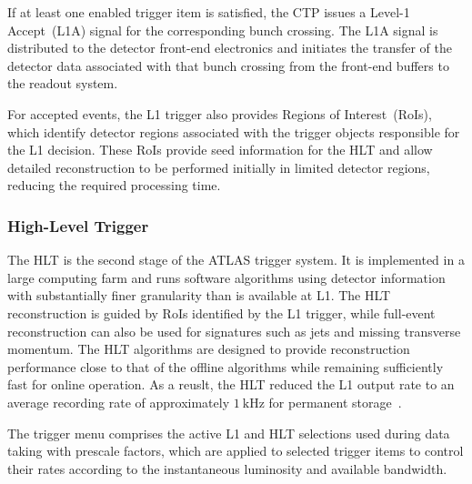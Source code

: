 If at least one enabled trigger item is satisfied, the CTP issues a Level-1 Accept~(L1A) signal for the corresponding bunch crossing.
The L1A signal is distributed to the detector front-end electronics and initiates the transfer of the detector data associated with that bunch crossing from the front-end buffers to the readout system.

For accepted events, the L1 trigger also provides Regions of Interest~(RoIs), which identify detector regions associated with the trigger objects responsible for the L1 decision.
These RoIs provide seed information for the HLT and allow detailed reconstruction to be performed initially in limited detector regions, reducing the required processing time.

\subsubsection*{High-Level Trigger}

The HLT is the second stage of the ATLAS trigger system.
It is implemented in a large computing farm and runs software algorithms using detector information with substantially finer granularity than is available at L1.
The HLT reconstruction is guided by RoIs identified by the L1 trigger, while full-event reconstruction can also be used for signatures such as jets and missing transverse momentum.
The HLT algorithms are designed to provide reconstruction performance close to that of the offline algorithms while remaining sufficiently fast for online operation.
As a reuslt, the HLT reduced the L1 output rate to an average recording rate of approximately $1~\mathrm{kHz}$ for permanent storage~\cite{ATLASTriggerRun2}.

The trigger menu comprises the active L1 and HLT selections used during data taking with prescale factors, which are applied to selected trigger items to control their rates according to the instantaneous luminosity and available bandwidth.